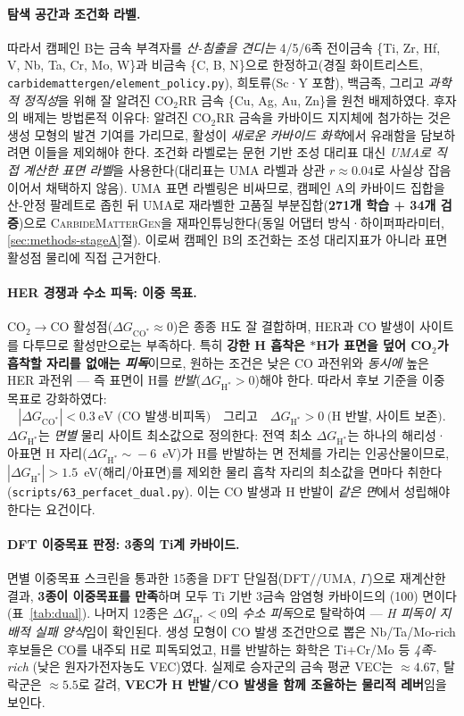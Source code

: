\documentclass[11pt,a4paper]{report}
\newcommand{\dGCO}{\Delta G_{\mathrm{CO^*}}}
\newcommand{\dGH}{\Delta G_{\mathrm{H^*}}}
\begin{document}
\paragraph{탐색 공간과 조건화 라벨.} 따라서 캠페인 B는 금속 부격자를 \emph{산-침출을 견디는} 4/5/6족
전이금속 \{Ti, Zr, Hf, V, Nb, Ta, Cr, Mo, W\}과 비금속 \{C, B, N\}으로 한정하고(경질 화이트리스트,
\texttt{carbidemattergen/element\_policy.py}), 희토류(Sc·Y 포함), 백금족, 그리고 \emph{과학적 정직성}을
위해 잘 알려진 CO$_2$RR 금속 \{Cu, Ag, Au, Zn\}을 원천 배제하였다. 후자의 배제는 방법론적
이유다: 알려진 CO$_2$RR 금속을 카바이드 지지체에 첨가하는 것은 생성 모형의 발견 기여를
가리므로, 활성이 \emph{새로운 카바이드 화학}에서 유래함을 담보하려면 이들을 제외해야 한다.
조건화 라벨로는 문헌 기반 조성 대리표 대신 \emph{UMA로 직접 계산한 표면 라벨}을 사용한다(대리표는
UMA 라벨과 상관 $r\!\approx\!0.04$로 사실상 잡음이어서 채택하지 않음). UMA 표면 라벨링은 비싸므로,
캠페인 A의 카바이드 집합을 산-안정 팔레트로 좁힌 뒤 UMA로 재라벨한 고품질 부분집합(\textbf{271개
학습 + 34개 검증})으로 \textsc{CarbideMatterGen}을 재파인튜닝한다(동일 어댑터 방식·하이퍼파라미터,
\ref{sec:methods-stageA}절). 이로써 캠페인 B의 조건화는 조성 대리지표가 아니라 표면 활성점 물리에
직접 근거한다.

\paragraph{HER 경쟁과 수소 피독: 이중 목표.} CO$_2\!\to\!$CO 활성점($\dGCO\!\approx\!0$)은 종종 H도
잘 결합하며, HER과 CO 발생이 사이트를 다투므로 활성만으로는 부족하다. 특히 \textbf{강한 H 흡착은
$*$H가 표면을 덮어 CO$_2$가 흡착할 자리를 없애는 \emph{피독}}이므로, 원하는 조건은 낮은 CO 과전위와
\emph{동시에} 높은 HER 과전위 --- 즉 표면이 H를 \emph{반발}($\dGH>0$)해야 한다. 따라서 후보 기준을
이중 목표로 강화하였다:
\[
|\dGCO|<0.3~\text{eV (CO 발생·비피독)} \quad\text{그리고}\quad \dGH>0~\text{(H 반발, 사이트 보존)}.
\]
$\dGH$는 \emph{면별} 물리 사이트 최소값으로 정의한다: 전역 최소 $\dGH$는 하나의 해리성·아표면 H
자리($\dGH\!\sim\!-6$~eV)가 H를 반발하는 면 전체를 가리는 인공산물이므로, $|\dGH|>1.5$~eV(해리/아표면)를
제외한 물리 흡착 자리의 최소값을 면마다 취한다(\texttt{scripts/63\_perfacet\_dual.py}). 이는 CO 발생과
H 반발이 \emph{같은 면}에서 성립해야 한다는 요건이다.

\paragraph{DFT 이중목표 판정: 3종의 Ti계 카바이드.} 면별 이중목표 스크린을 통과한 15종을 DFT
단일점(DFT$/\!/$UMA, $\Gamma$)으로 재계산한 결과, \textbf{3종이 이중목표를 만족}하며 모두 Ti 기반
3금속 암염형 카바이드의 (100) 면이다(표~\ref{tab:dual}). 나머지 12종은 $\dGH<0$의 \emph{수소 피독}으로
탈락하여 --- \emph{H 피독이 지배적 실패 양식}임이 확인된다. 생성 모형이 CO 발생 조건만으로 뽑은
Nb/Ta/Mo-rich 후보들은 CO를 내주되 H로 피독되었고, H를 반발하는 화학은 Ti+Cr/Mo 등 \emph{4족-rich}
(낮은 원자가전자농도 VEC)였다. 실제로 승자군의 금속 평균 VEC는 $\approx\!4.67$, 탈락군은
$\approx\!5.5$로 갈려, \textbf{VEC가 H 반발/CO 발생을 함께 조율하는 물리적 레버}임을 보인다.
\end{document}
